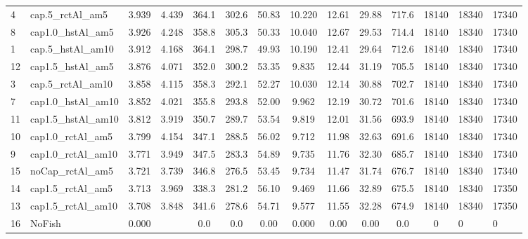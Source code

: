 \documentclass[11pt]{book}
\begin{document}
\begin{landscape}
\begin{longtable}[t]{llccccccccccll}
4 & cap.5\_rctAl\_am5 & 3.939 & 4.439 & 364.1 & 302.6 & 50.83 & 10.220 & 12.61 & 29.88 & 717.6 & 18140 & 18340 & 17340\\
8 & cap1.0\_hstAl\_am5 & 3.926 & 4.248 & 358.8 & 305.3 & 50.33 & 10.040 & 12.67 & 29.53 & 714.4 & 18140 & 18340 & 17340\\
1 & cap.5\_hstAl\_am10 & 3.912 & 4.168 & 364.1 & 298.7 & 49.93 & 10.190 & 12.41 & 29.64 & 712.6 & 18140 & 18340 & 17340\\
12 & cap1.5\_hstAl\_am5 & 3.876 & 4.071 & 352.0 & 300.2 & 53.35 & 9.835 & 12.44 & 31.19 & 705.5 & 18140 & 18340 & 17340\\
3 & cap.5\_rctAl\_am10 & 3.858 & 4.115 & 358.3 & 292.1 & 52.27 & 10.030 & 12.14 & 30.88 & 702.7 & 18140 & 18340 & 17340\\
7 & cap1.0\_hstAl\_am10 & 3.852 & 4.021 & 355.8 & 293.8 & 52.00 & 9.962 & 12.19 & 30.72 & 701.6 & 18140 & 18340 & 17340\\
11 & cap1.5\_hstAl\_am10 & 3.812 & 3.919 & 350.7 & 289.7 & 53.54 & 9.819 & 12.01 & 31.56 & 693.9 & 18140 & 18340 & 17340\\
10 & cap1.0\_rctAl\_am5 & 3.799 & 4.154 & 347.1 & 288.5 & 56.02 & 9.712 & 11.98 & 32.63 & 691.6 & 18140 & 18340 & 17340\\
9 & cap1.0\_rctAl\_am10 & 3.771 & 3.949 & 347.5 & 283.3 & 54.89 & 9.735 & 11.76 & 32.30 & 685.7 & 18140 & 18340 & 17340\\
15 & noCap\_rctAl\_am5 & 3.721 & 3.739 & 346.8 & 276.5 & 53.45 & 9.734 & 11.47 & 31.74 & 676.7 & 18140 & 18340 & 17340\\
14 & cap1.5\_rctAl\_am5 & 3.713 & 3.969 & 338.3 & 281.2 & 56.10 & 9.469 & 11.66 & 32.89 & 675.5 & 18140 & 18340 & 17350\\
13 & cap1.5\_rctAl\_am10 & 3.708 & 3.848 & 341.6 & 278.6 & 54.71 & 9.577 & 11.55 & 32.28 & 674.9 & 18140 & 18340 & 17350\\
16 & NoFish & 0.000 &  & 0.0 & 0.0 & 0.00 & 0.000 & 0.00 & 0.00 & 0.0 & 0 & 0 & 0\\*
\end{longtable}
\end{landscape}
\endgroup{}

\newpage
\end{document}
